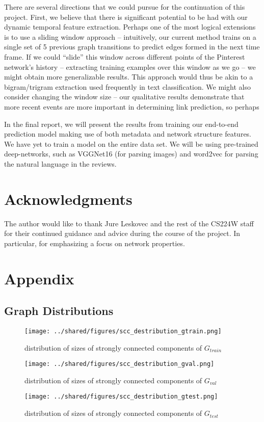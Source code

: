 \documentclass[letterpaper, 10 pt, conference]{ieeeconf}  %
\begin{document}
There are several directions that we could pursue for
the continuation of this project. First, we believe that
there is significant potential to be had with our dynamic
temporal feature extraction. Perhaps one of
the most logical extensions is to use a sliding window
approach – intuitively, our current method trains
on a single set of 5 previous graph transitions to predict
edges formed in the next time frame. If we
could “slide” this window across different points of
the Pinterest network’s history – extracting training
examples over this window as we go – we might obtain
more generalizable results. This approach would
thus be akin to a bigram/trigram extraction used frequently
in text classification. We might also consider
changing the window size – our qualitative results
demonstrate that more recent events are more
important in determining link prediction, so perhaps

In the final report, we will present the results from training our end-to-end prediction model making use of both metadata and network structure features. We have yet to train a model on the entire data set. We will be using pre-trained deep-networks, such as VGGNet16 (for parsing images) and word2vec for parsing the natural language in the reviews.

\section{Acknowledgments}
The author would like to thank Jure Leskovec and the rest of the CS224W staff for their continued guidance and advice during the course of the project. In particular, for emphasizing a focus on network properties.

{}


\section{Appendix}

\subsection{Graph Distributions}
\label{sec:graph_distributions}
\begin{figure}[h!]
\centering
\texttt{[image: ../shared/figures/scc\_destribution\_gtrain.png]}
\caption{distribution of sizes of strongly connected components of $G_{train}$}
\label{fig:distribution_scc_g_train}
\end{figure}
\begin{figure}[h!]
\centering
\texttt{[image: ../shared/figures/scc\_destribution\_gval.png]}
\caption{distribution of sizes of strongly connected components of $G_{val}$}
\label{fig:distribution_scc_g_val}
\end{figure}
\begin{figure}[h!]
\centering
\texttt{[image: ../shared/figures/scc\_destribution\_gtest.png]}
\caption{distribution of sizes of strongly connected components of $G_{test}$}
\label{fig:distribution_scc_g_test}
\end{figure}
\end{document}
